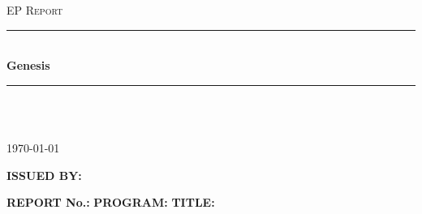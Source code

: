 \documentclass[12pt]{article} %
\numberwithin{figure}{section}
\numberwithin{table}{section}
\begin{document}

\begin{titlepage}

\newcommand{\HRule}{\rule{\linewidth}{0.5mm}} %

\center %


\textsc{\large EP Report}\\[0.5cm] %

\HRule \\[0.4cm]
{ \huge \bfseries Genesis}\\[.4cm] %
\HRule \\[1.5cm]


\begin{minipage}{0.4\textwidth}
\end{minipage}\\[4cm]

{\large \today}\\[3cm] %


\vfill %

\end{titlepage}


\thispagestyle{empty}

\textbf{ISSUED BY:}

\vspace{5.0cm}

\begin{flushright}
\begin{minipage}{0.75\textwidth}

\textbf{REPORT No.:} \linebreak \textbf{PROGRAM:} \linebreak \textbf{TITLE:} \linebreak

\end{minipage}
\end{flushright}
\end{document}
